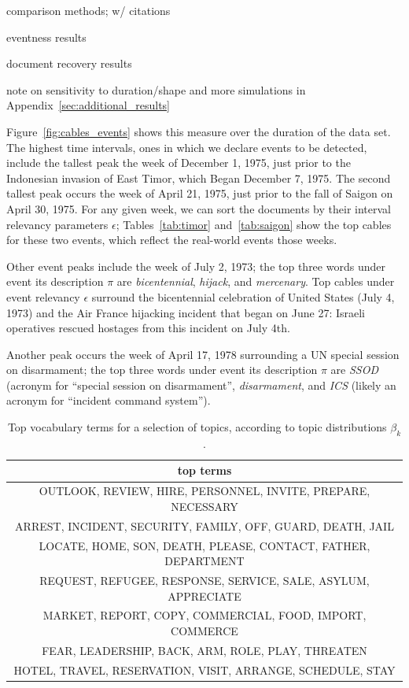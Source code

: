 \PP comparison methods; w/ citations

\PP eventness results

\PP document recovery results

\PP note on sensitivity to duration/shape and more simulations in Appendix~\ref{sec:additional_results}


Figure~\ref{fig:cables_events} shows this measure over the duration of the data set. The highest time intervals, ones in which we declare events to be detected, include the tallest peak the week of December 1, 1975, just prior to the Indonesian invasion of East Timor, which Began December 7, 1975.  The second tallest peak occurs the week of April 21, 1975, just prior to the fall of Saigon on April 30, 1975.  For any given week, we can sort the documents by their interval relevancy parameters $\epsilon$; Tables~\ref{tab:timor} and~\ref{tab:saigon} show the top cables for these two events, which reflect the real-world events those weeks.




Other event peaks include the week of July 2, 1973; the top three words under event its description $\pi$ are \emph{bicentennial}, \emph{hijack}, and \emph{mercenary}.  Top cables under event relevancy $\epsilon$ surround the bicentennial celebration of United States (July 4, 1973) and the Air France hijacking incident that began on June 27: Israeli operatives rescued hostages from this incident on July 4th.

Another peak occurs the week of April 17, 1978 surrounding a UN special session on disarmament; the top three words under event its description $\pi$ are \emph{SSOD} (acronym for ``special session on disarmament'', \emph{disarmament}, and \emph{ICS} (likely an acronym for ``incident command system'').

\begin{table}
\centering
\small
\begin{tabular}{c}
\toprule
top terms \\
\midrule
OUTLOOK, REVIEW, HIRE, PERSONNEL, INVITE, PREPARE, NECESSARY \\
ARREST, INCIDENT, SECURITY, FAMILY, OFF, GUARD, DEATH, JAIL \\
LOCATE, HOME, SON, DEATH, PLEASE, CONTACT, FATHER, DEPARTMENT \\
REQUEST, REFUGEE, RESPONSE, SERVICE, SALE, ASYLUM, APPRECIATE \\
MARKET, REPORT, COPY, COMMERCIAL, FOOD, IMPORT, COMMERCE \\
FEAR, LEADERSHIP, BACK, ARM, ROLE, PLAY, THREATEN \\
HOTEL, TRAVEL, RESERVATION, VISIT, ARRANGE, SCHEDULE, STAY \\
\bottomrule
\end{tabular}
\label{tab:topics}
\caption{Top vocabulary terms for a selection of topics, according to topic distributions $\beta_k$.}
\end{table}

